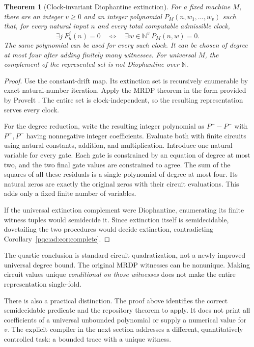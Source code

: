 \documentclass[11pt,letterpaper]{article}
\numberwithin{equation}{section}
\newtheorem{theorem}{Theorem}[section]
\theoremstyle{definition}
\theoremstyle{remark}
\newcommand{\N}{\mathbb N}
\begin{document}
\begin{theorem}[Clock-invariant Diophantine extinction]\label{pqc:ad:thm:mrdp}
For a fixed machine $M$, there are an integer $v\ge0$ and an integer
polynomial $P_M(n,w_1,\ldots,w_v)$ such that, for every natural input $n$
and every total computable admissible clock,
\begin{equation}\label{pqc:ad:eq:mrdp}
\exists j\ F_h^j(n)=0
\quad\Longleftrightarrow\quad
\exists w\in\N^v\ P_M(n,w)=0.
\end{equation}
The same polynomial can be used for every such clock. It can be chosen of
degree at most four after adding finitely many witnesses. For universal
$M$, the complement of the represented set is not Diophantine over $\N$.
\end{theorem}
\begin{proof}
Use the constant-drift map. Its extinction set is recursively enumerable
by exact natural-number iteration. Apply the MRDP theorem in the form
provided by ProveIt \cite{b62s12-proveit-mrdp,b62s12-proveit-source}. The entire set is
clock-independent, so the resulting representation serves every clock.

For the degree reduction, write the resulting integer polynomial as
$P^+-P^-$ with $P^+,P^-$ having nonnegative integer coefficients. Evaluate
both with finite circuits using natural constants, addition, and
multiplication. Introduce one natural variable for every gate. Each gate
is constrained by an equation of degree at most two, and the two final
gate values are constrained to agree. The sum of the squares of all these
residuals is a single polynomial of degree at most four. Its natural zeros
are exactly the original zeros with their circuit evaluations. This adds
only a fixed finite number of variables.

If the universal extinction complement were Diophantine, enumerating its
finite witness tuples would semidecide it. Since extinction itself is
semidecidable, dovetailing the two procedures would decide extinction,
contradicting Corollary~\ref{pqc:ad:cor:complete}.
\end{proof}

The quartic conclusion is standard circuit quadratization, not a newly
improved universal degree bound. The original MRDP witnesses can be
nonunique. Making circuit values unique \emph{conditional on those
witnesses} does not make the entire representation single-fold.

There is also a practical distinction. The proof above identifies the
correct semidecidable predicate and the repository theorem to apply. It
does not print all coefficients of a universal unbounded polynomial or
supply a numerical value for $v$. The explicit compiler in the next
section addresses a different, quantitatively controlled task: a bounded
trace with a unique witness.
\end{document}
